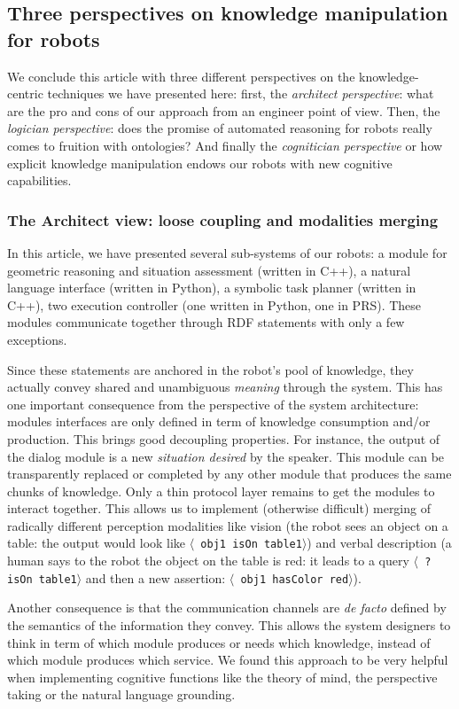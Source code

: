 \documentclass[letterpaper, 10 pt, conference]{ieeeconf}  %
\newcommand{\stmt}[1]{{\footnotesize \tt $\langle$ #1\relax$\rangle$}}
\begin{document}
\subsection{Three perspectives on knowledge manipulation for robots}

We conclude this article with three different perspectives on the knowledge-centric
techniques we have presented here: first, the \emph{architect perspective}:
what are the pro and cons of our approach from an engineer point of view. Then,
the \emph{logician perspective}: does the promise of automated reasoning for
robots really comes to fruition with ontologies? And finally the
\emph{cognitician perspective} or how explicit knowledge manipulation endows
our robots with new cognitive capabilities.

\subsubsection{The Architect view: loose coupling and modalities merging}

In this article, we have presented several sub-systems of our robots: a module for geometric
reasoning and situation assessment (written in C++), a natural
language interface (written in Python), a symbolic task planner (written in
C++), two execution controller (one written in Python, one in PRS). These
modules communicate together through RDF statements with only a few exceptions.

Since these statements are anchored in the robot's pool of knowledge, they
actually convey shared and unambiguous \emph{meaning} through the system. This
has one important consequence from the perspective of the system architecture:
modules interfaces are only defined in term of knowledge consumption and/or
production. This brings good decoupling properties. For instance, the output of
the dialog module is a new \emph{situation desired} by the speaker. This module
can be transparently replaced or completed by any other module that produces
the same chunks of knowledge. Only a thin protocol layer remains to get the
modules to interact together. This allows us to implement (otherwise difficult)
merging of radically different perception modalities like vision (the robot
sees an object on a table: the output would look like \stmt{obj1 isOn table1})
and verbal description (a human says to the robot the object on the table
is red: it leads to a query \stmt{? isOn table1} and then a new assertion:
\stmt{obj1 hasColor red}).

Another consequence is that the communication channels are {\it
de facto} defined by the semantics of the information they
convey. This allows the system designers to think in term of which module
produces or needs which knowledge, instead of which module produces which
service. We found this approach to be very helpful when implementing cognitive
functions like the theory of mind, the perspective taking or the natural
language grounding.
\end{document}
